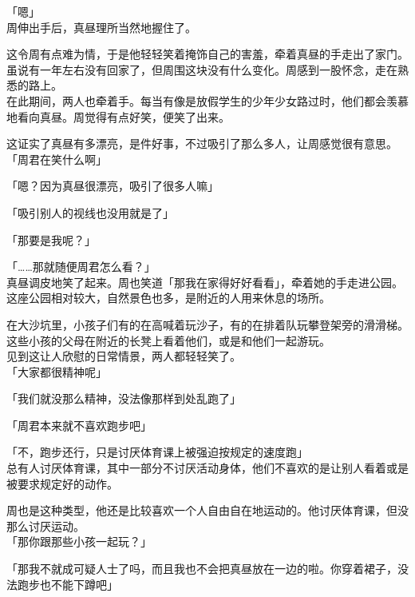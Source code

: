 「嗯」\\

周伸出手后，真昼理所当然地握住了。

这令周有点难为情，于是他轻轻笑着掩饰自己的害羞，牵着真昼的手走出了家门。\\

虽说有一年左右没有回家了，但周围这块没有什么变化。周感到一股怀念，走在熟悉的路上。\\

在此期间，两人也牵着手。每当有像是放假学生的少年少女路过时，他们都会羡慕地看向真昼。周觉得有点好笑，便笑了出来。

这证实了真昼有多漂亮，是件好事，不过吸引了那么多人，让周感觉很有意思。\\

「周君在笑什么啊」

「嗯？因为真昼很漂亮，吸引了很多人嘛」

「吸引别人的视线也没用就是了」

「那要是我呢？」

「……那就随便周君怎么看？」\\

真昼调皮地笑了起来。周也笑道「那我在家得好好看看」，牵着她的手走进公园。\\

这座公园相对较大，自然景色也多，是附近的人用来休息的场所。

在大沙坑里，小孩子们有的在高喊着玩沙子，有的在排着队玩攀登架旁的滑滑梯。这些小孩的父母在附近的长凳上看着他们，或是和他们一起游玩。\\

见到这让人欣慰的日常情景，两人都轻轻笑了。\\

「大家都很精神呢」

「我们就没那么精神，没法像那样到处乱跑了」

「周君本来就不喜欢跑步吧」

「不，跑步还行，只是讨厌体育课上被强迫按规定的速度跑」\\

总有人讨厌体育课，其中一部分不讨厌活动身体，他们不喜欢的是让别人看着或是被要求规定好的动作。

周也是这种类型，他还是比较喜欢一个人自由自在地运动的。他讨厌体育课，但没那么讨厌运动。\\

「那你跟那些小孩一起玩？」

「那我不就成可疑人士了吗，而且我也不会把真昼放在一边的啦。你穿着裙子，没法跑步也不能下蹲吧」

